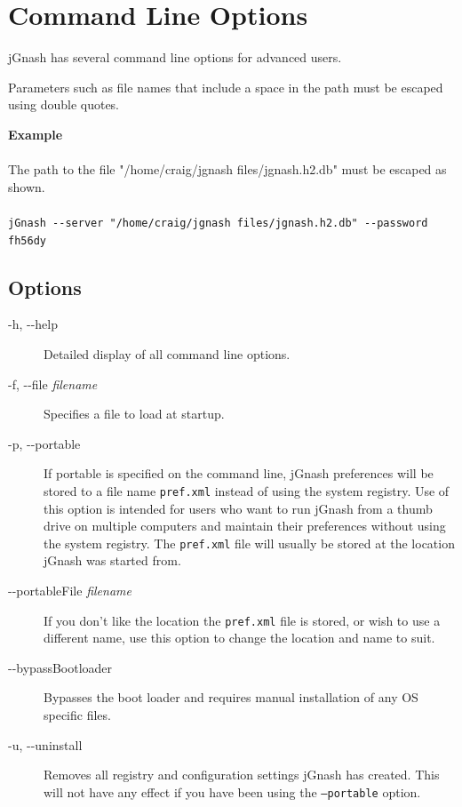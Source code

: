 \documentclass[letterpaper,12pt]{book}
\begin{document}
    \chapter{Command Line Options}
    \label{ch:cmdOptions}

    jGnash has several command line options for advanced users.

    Parameters such as file names that include a space in the path must be escaped using double quotes.

    \begin{mdframed}[style=info]
        \textbf{Example} \\ \\
        The path to the file "/home/craig/jgnash files/jgnash.h2.db" must be escaped as shown.
        \\ \\
        \texttt{jGnash -{}-server "/home/craig/jgnash files/jgnash.h2.db" -{}-password fh56dy}
    \end{mdframed}

    \section{Options}
    \begin{description}
        \item[-h, -{}-help]
        Detailed display of all command line options.
        \item[-f, -{}-file \textit{filename}]
        Specifies a file to load at startup.
        \item[-p, -{}-portable]
        If portable is specified on the command line, jGnash preferences will be stored to a file name \texttt{pref.xml}
        instead of using the system registry.
        Use of this option is intended for users who want to run jGnash from a thumb drive on multiple computers and
        maintain their preferences without using the system registry.
        The \texttt{pref.xml} file will usually be stored at the location jGnash was started from.
        \item[-{}-portableFile \textit{filename}]
        If you don't like the location the \texttt{pref.xml} file is stored, or wish to use a different name, use
        this option to change the location and name to suit.
        \item[-{}-bypassBootloader]
        Bypasses the boot loader and requires manual installation of any OS specific files.
        \item[-u, -{}-uninstall]
        Removes all registry and configuration settings jGnash has created.
        This will not have any effect if you have been using the \texttt{--portable} option.
    \end{description}
\end{document}
